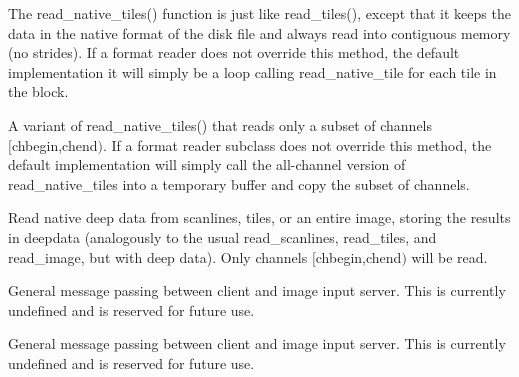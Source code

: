 The {\kw read_native_tiles()} function is just like {\kw read_tiles()}, 
except that it keeps the data in the native format of the disk file and
always read into contiguous memory (no strides).  
If a format reader does not override this method, the default
implementation it will simply be a loop calling read_native_tile
for each tile in the block.
\apiend

A variant of {\kw read_native_tiles()} that reads only a subset of 
channels \\ $[${\cf chbegin},{\cf chend}$)$.  
If a format reader subclass does
not override this method, the default implementation will simply
call the all-channel version of {\cf read_native_tiles} into a
temporary buffer and copy the subset of channels.
\apiend

Read native deep data from scanlines, tiles, or an entire image, 
storing the results in {\cf deepdata} (analogously to the usual
{\cf read_scanlines}, {\cf read_tiles},
and {\cf read_image}, but with deep data).
Only channels $[${\cf chbegin},{\cf chend}$)$
will be read.
\apiend

General message passing between client and image input server.
This is currently undefined and is reserved for future use.
\apiend

General message passing between client and image input server.
This is currently undefined and is reserved for future use.
\apiend

